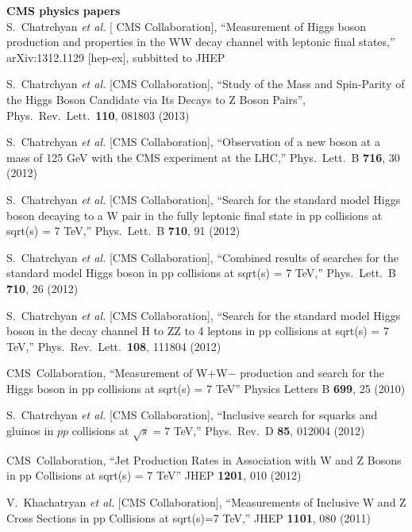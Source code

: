         {\bf CMS physics papers}
        \\    

  S.~Chatrchyan {\it et al.}  [ CMS Collaboration],
  ``Measurement of Higgs boson production and properties in the WW decay channel with leptonic final states,''
  arXiv:1312.1129 [hep-ex], subbitted to JHEP

  S.~Chatrchyan {\it et al.}  [CMS Collaboration],
  ``Study of the Mass and Spin-Parity of the Higgs Boson Candidate via Its Decays to Z Boson Pairs'',
  Phys.\ Rev.\ Lett.\  {\bf 110}, 081803 (2013)

  S.~Chatrchyan {\it et al.}  [CMS Collaboration],
  ``Observation of a new boson at a mass of 125 GeV with the CMS experiment at the LHC,''
  Phys.\ Lett.\ B {\bf 716}, 30 (2012)

  S.~Chatrchyan {\it et al.}  [CMS Collaboration],
  ``Search for the standard model Higgs boson decaying to a W pair in the fully leptonic final state in pp collisions at sqrt(s) = 7 TeV,''
  Phys.\ Lett.\ B {\bf 710}, 91 (2012)

  S.~Chatrchyan {\it et al.}  [CMS Collaboration],
  ``Combined results of searches for the standard model Higgs boson in pp collisions at sqrt(s) = 7 TeV,''
  Phys.\ Lett.\ B {\bf 710}, 26 (2012)

  S.~Chatrchyan {\it et al.}  [CMS Collaboration],
  ``Search for the standard model Higgs boson in the decay channel H to ZZ to 4 leptons in pp collisions at sqrt(s) = 7 TeV,''
  Phys.\ Rev.\ Lett.\  {\bf 108}, 111804 (2012)

  CMS~Collaboration,
  ``Measurement of W+W− production and search for the Higgs boson in pp collisions at sqrt(s) = 7 TeV''
  Physics Letters B {\bf 699}, 25 (2010)

  S.~Chatrchyan {\it et al.}  [CMS Collaboration],
  ``Inclusive search for squarks and gluinos in $pp$ collisions at $\sqrt{s}=7$ TeV,''
  Phys.\ Rev.\ D {\bf 85}, 012004 (2012)

  CMS~Collaboration,
  ``Jet Production Rates in Association with W and Z Bosons in pp Collisions at sqrt(s) = 7 TeV''
  JHEP {\bf 1201}, 010 (2012)

  V.~Khachatryan {\it et al.}  [CMS Collaboration],
  ``Measurements of Inclusive W and Z Cross Sections in pp Collisions at sqrt(s)=7 TeV,''
  JHEP {\bf 1101}, 080 (2011)



